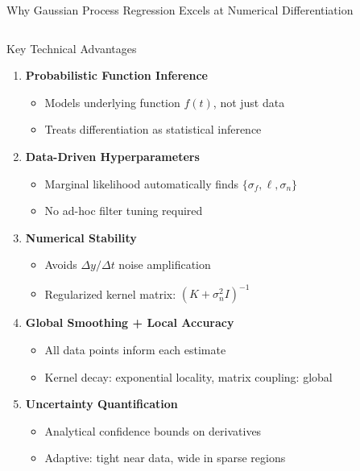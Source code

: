 \documentclass[aspectratio=169]{beamer}
\begin{document}
\begin{frame}{Why Gaussian Process Regression Excels at Numerical Differentiation}
\begin{columns}[t]
    \begin{column}{0.48\textwidth}
      \vspace{-0.5em}
      \begin{block}{\small Key Technical Advantages}
        \small
        \begin{enumerate}
          \item \textbf{Probabilistic Function Inference}
          \begin{itemize}
            \tiny
            \item Models underlying function $f(t)$, not just data
            \item Treats differentiation as statistical inference
          \end{itemize}
          
          \item \textbf{Data-Driven Hyperparameters}
          \begin{itemize}
            \tiny
            \item Marginal likelihood automatically finds $\{\sigma_f, \ell, \sigma_n\}$
            \item No ad-hoc filter tuning required
          \end{itemize}
          
          \item \textbf{Numerical Stability}
          \begin{itemize}
            \tiny
            \item Avoids $\Delta y/\Delta t$ noise amplification
            \item Regularized kernel matrix: $(K + \sigma_n^2 I)^{-1}$
          \end{itemize}
          
          \item \textbf{Global Smoothing + Local Accuracy}
          \begin{itemize}
            \tiny
            \item All data points inform each estimate
            \item Kernel decay: exponential locality, matrix coupling: global
          \end{itemize}
          
          \item \textbf{Uncertainty Quantification}
          \begin{itemize}
            \tiny
            \item Analytical confidence bounds on derivatives
            \item Adaptive: tight near data, wide in sparse regions
          \end{itemize}
        \end{enumerate}
      \end{block}
    \end{column}
    

\end{columns}
\end{frame}
\end{document}
